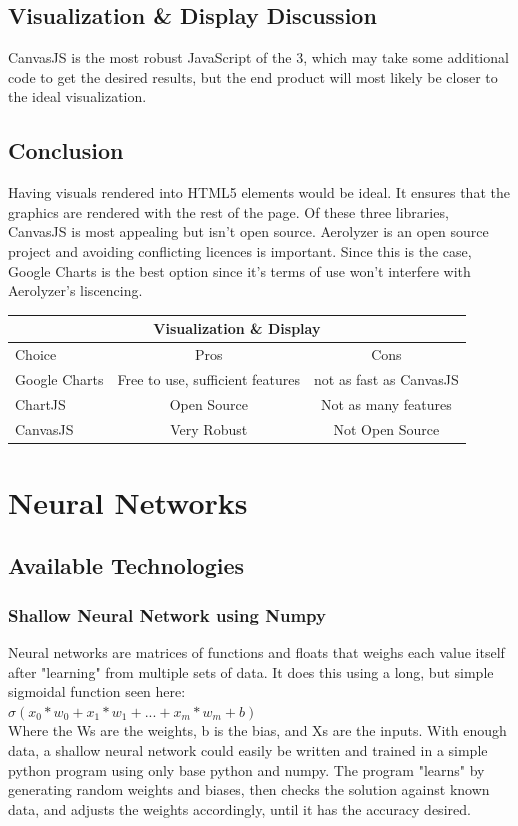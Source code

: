 \documentclass[onecolumn, draftclsnofoot,10pt, compsoc]{IEEEtran}
\begin{document}
\begin{singlespace}
\subsection{Visualization \& Display Discussion}
CanvasJS is the most robust JavaScript of the 3, which may take some additional code to get the desired results, but the end product will most likely be closer to the ideal visualization. \cite{CanvasJS}
\subsection{Conclusion}
Having visuals rendered into HTML5 elements would be ideal.
It ensures that the graphics are rendered with the rest of the page.
Of these three libraries, CanvasJS is most appealing but isn't open source.
Aerolyzer is an open source project and avoiding conflicting licences is important.
Since this is the case, Google Charts is the best option since it's terms of use won't interfere with Aerolyzer's liscencing.\cite{GoogleCh}\cite{CanvasJS}
\begin{center}
	\begin{tabular}{|l|c|c|} 
		\hline
		\multicolumn{3}{|c|}{Visualization \& Display} \\
		\hline
		Choice & Pros & Cons\\ [0.5ex] 
		\hline\hline
		Google Charts & Free to use, sufficient features & not as fast as CanvasJS \\ 
		\hline
		ChartJS & Open Source & Not as many features\\
		\hline
		CanvasJS & Very Robust & Not Open Source\\ [1ex] 
		\hline
	\end{tabular}
\end{center}

\section{Neural Networks}
\subsection{Available Technologies}
\subsubsection{Shallow Neural Network using Numpy}
Neural networks are matrices of functions and floats that weighs each value itself after "learning" from multiple sets of data. It does this using a long, but simple sigmoidal function seen here:\\
$\sigma(x_0*w_0 + x_1*w_1 + ... + x_m*w_m + b)$\cite{nn}\\
Where the Ws are the weights, b is the bias, and Xs are the inputs. 
With enough data, a shallow neural network could easily be written and trained in a simple python program using only base python and numpy. The program "learns" by generating random weights and biases, then checks the solution against known data, and adjusts the weights accordingly, until it has the accuracy desired. 


\end{singlespace}
\end{document}
